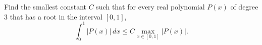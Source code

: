 Find the smallest constant $C$ such that for every real polynomial $P(x)$ of degree 3 that has a root in the interval $[0,1]$,
\[
\int_0^1 \left| P(x) \right|\,dx \leq C \max_{x \in [0,1]} \left| P(x) \right|.
\]
